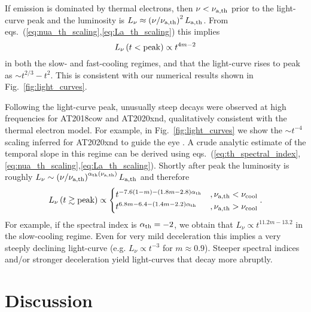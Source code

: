 \documentclass[twocolumn]{aastex63}
\begin{document}
If emission is dominated by thermal electrons, then $\nu < \nu_{\rm a,th}$ prior to the light-curve peak and the luminosity is $L_\nu \approx \left(\nu/\nu_{\rm a,th}\right)^2 L_{\rm a,th}$. 
From eqs.~(\ref{eq:nua_th_scaling},\ref{eq:La_th_scaling}) this implies 
\begin{equation}
    L_\nu \left(t<{\rm peak}\right)
    \propto t^{4m-2}
\end{equation}
in both the slow- and fast-cooling regimes, and that the light-curve rises to peak as $\sim t^{2/3} - t^2$. This is consistent with our numerical results shown in Fig.~\ref{fig:light_curves}. 

Following the light-curve peak, unusually steep decays were observed at high frequencies for AT2018cow and AT2020xnd, qualitatively consistent with the thermal electron model.
For example, in Fig.~\ref{fig:light_curves} we show the $\sim t^{-4}$ scaling inferred for AT2020xnd to guide the eye \citep{Ho+21b}.
A crude analytic estimate of the temporal slope in this regime can be derived using eqs.~(\ref{eq:th_spectral_index},\ref{eq:nua_th_scaling},\ref{eq:La_th_scaling}). Shortly after peak the luminosity is roughly $L_\nu \sim \left(\nu/\nu_{\rm a,th}\right)^{\alpha_{\rm th}(\nu_{\rm a,th})} L_{\rm a,th}$ and therefore
\begin{equation}
\label{eq:lightcurve_decline}
    L_\nu \left(t \gtrsim {\rm peak}\right)
    \propto
    \begin{cases}
    t^{-7.6 (1-m) - (1.8m-2.8)\alpha_{\rm th}} &, \nu_{\rm a,th} < \nu_{\rm cool}
    \\
    t^{6.8m-6.4 - (1.4m-2.2)\alpha_{\rm th}} &, \nu_{\rm a,th} > \nu_{\rm cool}
    \end{cases}
    .
\end{equation}
For example, if the spectral index is $\alpha_{\rm th} = -2$, we obtain that $L_\nu \propto t^{11.2m-13.2}$ in the slow-cooling regime. Even for very mild deceleration this implies a very steeply declining light-curve (e.g. $L_\nu \propto t^{-3}$ for $m \approx 0.9$). Steeper spectral indices and/or stronger deceleration yield light-curves that decay more abruptly.



\section{Discussion}
\label{sec:discussion}
\end{document}

